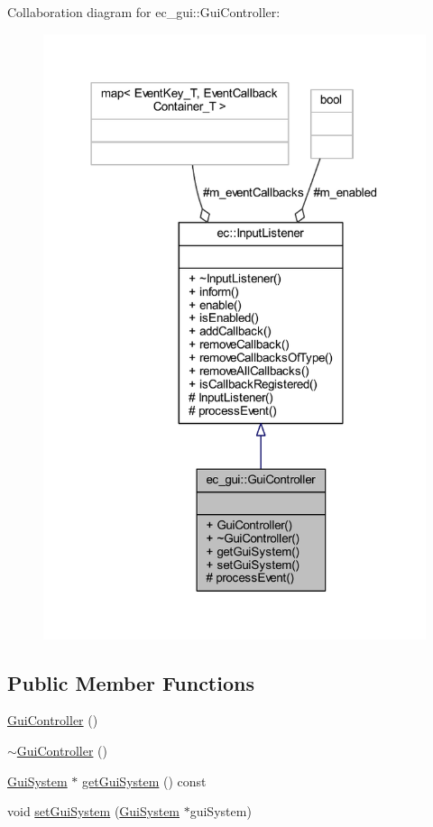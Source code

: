 Collaboration diagram for ec\+\_\+gui\+:\+:Gui\+Controller\+:\nopagebreak
\begin{figure}[H]
\begin{center}
\leavevmode
\includegraphics[width=318pt]{classec__gui_1_1_gui_controller__coll__graph}
\end{center}
\end{figure}
\subsection*{Public Member Functions}
\begin{DoxyCompactItemize}
\item 
\mbox{\hyperlink{classec__gui_1_1_gui_controller_addbc4de5b44cf9cb31c9e75ef7cb831e}{Gui\+Controller}} ()
\item 
\mbox{\hyperlink{classec__gui_1_1_gui_controller_a09a337aecb5e13dffb38693a60c33530}{$\sim$\+Gui\+Controller}} ()
\item 
\mbox{\hyperlink{classec__gui_1_1_gui_system}{Gui\+System}} $\ast$ \mbox{\hyperlink{classec__gui_1_1_gui_controller_ac622f414d602de0d4643e35bfa5f49ac}{get\+Gui\+System}} () const
\item 
void \mbox{\hyperlink{classec__gui_1_1_gui_controller_a8626a59627393e9a612563164f71f764}{set\+Gui\+System}} (\mbox{\hyperlink{classec__gui_1_1_gui_system}{Gui\+System}} $\ast$gui\+System)
\end{DoxyCompactItemize}
